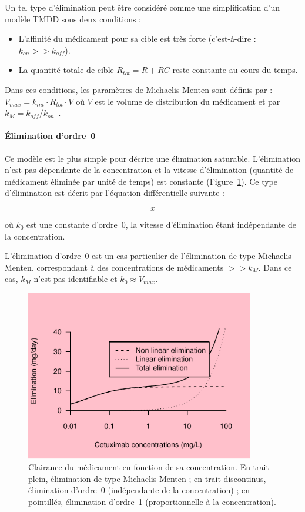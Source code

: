 Un tel type d'élimination peut être considéré comme une simplification d'un modèle TMDD sous deux conditions :
\begin{itemize}
\item L'affinité du médicament pour sa cible est très forte (c'est-à-dire : $k_{on} >> k_{off}$).
\item La quantité totale de cible $R_{tot} =  R + RC$ reste constante au cours du temps.
\end{itemize}
Dans ces conditions, les paramètres de Michaelis-Menten sont définis par : $V_{max} = k_{int}\cdot R_{tot}\cdot V$ où $V$ est le volume de distribution du médicament et par $k_M = k_{off} /k_{on}$~\citep{REF4, REF6}.
\paragraph{Élimination d'ordre~0} Ce modèle est le plus simple pour décrire une élimination saturable. L'élimination n'est pas dépendante de la concentration et la vitesse d'élimination (quantité de médicament éliminée par unité de temps) est constante (Figure~\ref{fig:8}). Ce type d'élimination est décrit par l'équation différentielle suivante :

\begin{equation}
x
\label{eq:35}
\end{equation}

où $k_0$ est une constante d'ordre~0, la vitesse d'élimination étant indépendante de la concentration.

L'élimination d'ordre~0 est un cas particulier de l'élimination de type Michaelis-Menten, correspondant à des concentrations de médicaments $>> k_M$. Dans ce cas, $k_M$ n'est pas identifiable et $k_0 \approx V_{max}$.

\begin{figure}[htbp]
	\centering
		\includegraphics[width=10cm]{images/essai001.pdf}
	\caption[Clairance du médicament en fonction de sa concentration.]{Clairance du médicament en fonction de sa concentration. En trait plein, élimination de type Michaelis-Menten ; en trait discontinus, élimination d'ordre~0 (indépendante de la concentration) ; en pointillés, élimination d'ordre~1 (proportionnelle à la concentration).}
	\label{fig:8}
\end{figure}

